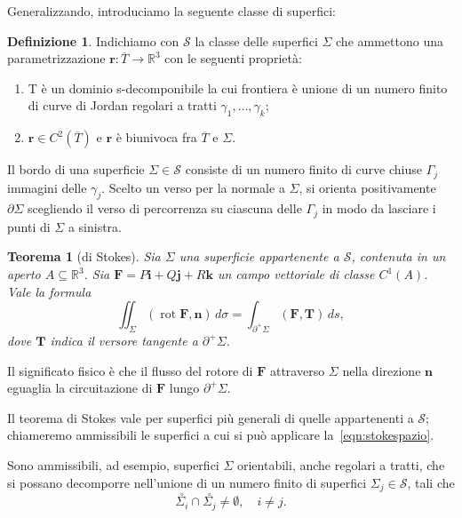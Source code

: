 \documentclass[a4paper]{book}
\DeclareMathOperator{\rot}{rot}
\numberwithin{equation}{section}
\theoremstyle{plain}
\newtheorem{teor}{Teorema}[section]
\theoremstyle{definition}
\newtheorem{defn}{Definizione}[section]
\theoremstyle{remark}
\renewcommand{\vec}{\boldsymbol}
\theoremstyle{example}
\begin{document}
	Generalizzando, introduciamo la seguente classe di superfici:
	\begin{defn}
		Indichiamo con $\mathcal{S}$ la classe delle superfici $\Sigma$ che ammettono una parametrizzazione $\vec{r} \colon \! \overline{T} \to \mathbb{R}^3$ con le seguenti proprietà:
		\begin{enumerate}
			\item T è un dominio s-decomponibile la cui frontiera è unione di un numero finito di curve di Jordan regolari a tratti $\gamma_1, \dots, \gamma_k$;
			\item $\vec{r} \in C^2(\overline{T})$ e $\vec{r}$ è biunivoca fra $\overline{T}$ e $\Sigma$.
		\end{enumerate}
	\end{defn}

	Il bordo di una superficie $\Sigma \in \mathcal{S}$ consiste di un numero finito di curve chiuse $\Gamma_j$ immagini delle $\gamma_j$. Scelto un verso per la normale a $\Sigma$, si orienta positivamente $\partial \Sigma$ scegliendo il verso di percorrenza su ciascuna delle $\Gamma_j$ in modo da lasciare i punti di $\Sigma$ a sinistra.

	\begin{teor}[di Stokes]
		Sia $\Sigma$ una superficie appartenente a $\mathcal{S}$, contenuta in un aperto $A \subseteq \mathbb{R}^3$. Sia $\vec{F} = P\vec{i} + Q\vec{j} + R\vec{k}$ un campo vettoriale di classe $C^1(A)$. Vale la formula
		\begin{equation}
			\label{eqn:stokespazio}
			\iint_{\Sigma} (\rot \vec{F}, \vec{n}) \, d\sigma = \int_{\partial^+\Sigma} (\vec{F}, \vec{T})\, ds,
		\end{equation}
		dove $\vec{T}$ indica il versore tangente a $\partial^+ \Sigma$.
	\end{teor}

	Il significato fisico è che il flusso del rotore di $\vec{F}$ attraverso $\Sigma$ nella direzione $\vec{n}$ eguaglia la circuitazione di $\vec{F}$ lungo $\partial^+ \Sigma$.

	Il teorema di Stokes vale per superfici più generali di quelle appartenenti a $\mathcal{S}$; chiameremo ammissibili le superfici a cui si può applicare la~\eqref{eqn:stokespazio}.

	Sono ammissibili, ad esempio, superfici $\Sigma$ orientabili, anche regolari a tratti, che si possano decomporre nell'unione di un numero finito di superfici $\Sigma_j \in \mathcal{S}$, tali che
	\begin{equation*}
		\overset{\circ}{\Sigma_i} \cap \overset{\circ}{\Sigma_j} \ne \emptyset, \quad i \ne j.
	\end{equation*}
\end{document}
